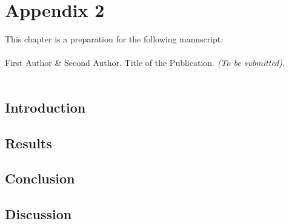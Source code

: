 \chapter{Appendix 2}

\label{appendix:appendix02}

\vspace{3cm}

This chapter is a preparation for the following manuscript:\\
\\
First Author \& 
Second Author. Title of the Publication. \textit{(To be submitted)}.\\
\\

\clearpage

\section{Introduction}
\lipsum[1-10]

\section{Results}
\lipsum[1-10]

\section{Conclusion}
\lipsum[1-10]

\section{Discussion}
\lipsum[1-10]



